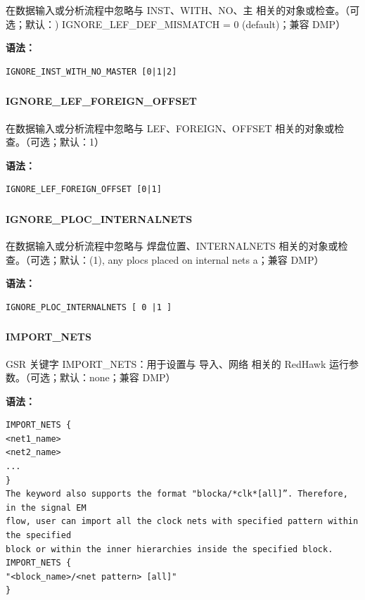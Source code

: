 在数据输入或分析流程中忽略与 INST、WITH、NO、主 相关的对象或检查。（可选；默认：) IGNORE_LEF_DEF_MISMATCH = 0 (default)；兼容 DMP）

\textbf{语法：}
\begin{lstlisting}
IGNORE_INST_WITH_NO_MASTER [0|1|2]
\end{lstlisting}

\subsubsection{}
\paragraph*{IGNORE_LEF_FOREIGN_OFFSET}

在数据输入或分析流程中忽略与 LEF、FOREIGN、OFFSET 相关的对象或检查。（可选；默认：1）

\textbf{语法：}
\begin{lstlisting}
IGNORE_LEF_FOREIGN_OFFSET [0|1]
\end{lstlisting}

\subsubsection{}
\paragraph*{IGNORE_PLOC_INTERNALNETS}

在数据输入或分析流程中忽略与 焊盘位置、INTERNALNETS 相关的对象或检查。（可选；默认：(1), any plocs placed on internal nets a；兼容 DMP）

\textbf{语法：}
\begin{lstlisting}
IGNORE_PLOC_INTERNALNETS [ 0 |1 ]
\end{lstlisting}

\subsubsection{}
\paragraph*{IMPORT_NETS}

GSR 关键字 IMPORT_NETS：用于设置与 导入、网络 相关的 RedHawk 运行参数。（可选；默认：none；兼容 DMP）

\textbf{语法：}
\begin{lstlisting}
IMPORT_NETS {
<net1_name>
<net2_name>
...
}
The keyword also supports the format "blocka/*clk*[all]”. Therefore, in the signal EM
flow, user can import all the clock nets with specified pattern within the specified
block or within the inner hierarchies inside the specified block.
IMPORT_NETS {
"<block_name>/<net pattern> [all]"
}
\end{lstlisting}

